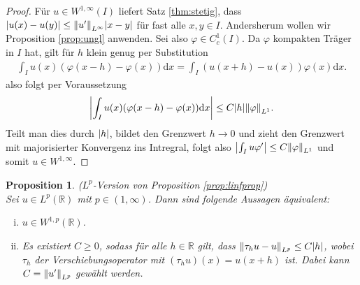 \documentclass[twoside]{article}
\newtheorem{proposition}[theorem]{Proposition}
\theoremstyle{definition}
\begin{document}
\begin{proof}
Für $u \in W^{1,\infty}(I)$ liefert Satz \ref{thm:stetig}, dass $\abs{u(x)-u(y)} \leq \norm{u'}_{L^\infty} \abs{x-y}$ für fast alle $x,y \in I$. Andersherum wollen wir Proposition \ref{prop:ungl} anwenden. Sei also $\varphi \in C_c^1(I)$. Da $\varphi$ kompakten Träger in $I$ hat, gilt für $h$ klein genug per Substitution 
\begin{align*}
\int_I u(x) (\varphi(x-h)-\varphi(x)) \mathrm{d}x = \int_I (u(x+h)-u(x)) \varphi(x) \mathrm{d}x.
\end{align*}
also folgt per Voraussetzung
\begin{align*}
\abs{\int_I u(x) (\varphi(x-h)-\varphi(x)) \mathrm{d}x } \leq C \abs{h} \norm{\varphi}_{L^1}.
\end{align*}
Teilt man dies durch $\abs{h}$, bildet den Grenzwert $h \to 0$ und zieht den Grenzwert mit majorisierter Konvergenz ins Intregral, folgt also $\abs{\int_I u \varphi'} \leq C \norm{\varphi}_{L^1}$ und somit $u \in W^{1,\infty}$.
\end{proof}
\begin{proposition} ($L^p$-Version von Proposition \ref{prop:linfprop}) \label{prop:lpprop}\\
Sei $u \in L^p(\mathbb{R})$ mit $p \in (1,\infty)$. Dann sind folgende Aussagen äquivalent:
\begin{enumerate}[(i)]
\item $u \in W^{1,p}(\mathbb{R})$.
\item Es existiert $C \geq 0$, sodass für alle $h \in \mathbb{R}$ gilt, dass $\norm{\tau_h u - u}_{L^p} \leq C \abs{h}$, wobei $\tau_h$ der Verschiebungsoperator mit $(\tau_h u)(x) = u(x+h)$ ist. Dabei kann $C = \norm{u'}_{L^p}$ gewählt werden.
\end{enumerate}
\end{proposition}
\end{document}
